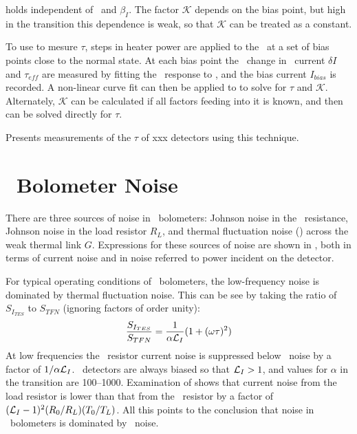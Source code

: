  holds independent of \Loop\ and $\beta_I$.
The factor $\mathcal{K}$ depends on the bias point, but high in the transition this dependence is weak, so that $\mathcal{K}$ can be treated as a constant.

To use  to mesure $\tau$, steps in heater power are applied to the \TES\ at a set of bias points close to the normal state.
At each bias point the \DC\ change in \TES\ current $\delta I$ and $\tau_{eff}$ are measured by fitting the \TES\ response to , and the bias current $I_{bias}$ is recorded.
A non-linear curve fit can then be applied to  to solve for $\tau$ and $\mathcal{K}$.
Alternately, $\mathcal{K}$ can be calculated if all factors feeding into it is known, and then  can be solved directly for $\tau$.

 Presents measurements of the $\tau$ of xxx detectors using this technique.

\section{\TES\ Bolometer Noise}

There are three sources of noise in \TES\ bolometers: Johnson noise in the \TES\ resistance, Johnson noise in the load resistor $R_L$, and thermal fluctuation noise (\TFN) across the weak thermal link $G$.
Expressions for these sources of noise are shown in , both in terms of current noise and in noise referred to power incident on the detector.

For typical operating conditions of \TES\ bolometers, the low-frequency noise is dominated by thermal fluctuation noise.
This can be see by taking the ratio of $S_{I_{TES}}$ to $S_{TFN}$ (ignoring factors of order unity):
\begin{equation}
\frac{S_{I_{TES}}}{S_{TFN}} = \frac{1}{\alpha \mathcal{L}_I} (1 + (\omega \tau)^2)
\end{equation}
At low frequencies the \TES\ resistor current noise is suppressed below \TFN\ noise by a factor of $1/\alpha \mathcal{L}_I$.
\TES\ detectors are always biased so that $\mathcal{L}_I > 1$, and values for $\alpha$ in the transition are 100--1000.
Examination of  shows that current noise from the load resistor is lower than that from the \TES\ resistor by a factor of $(\mathcal{L}_I-1)^2 (R_0 / R_L) (T_0/T_L)$.
All this points to the conclusion that noise in \TES\ bolometers is dominated by \TFN\ noise.

